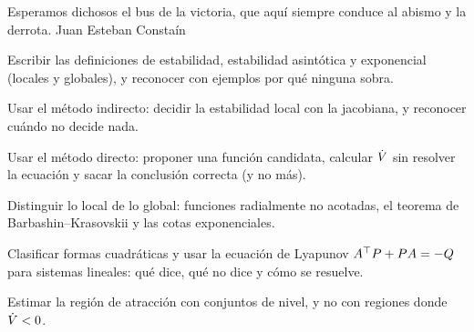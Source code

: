 
  {Esperamos dichosos el bus de la victoria, que aquí siempre conduce al abismo y la derrota.}
  {Juan Esteban Constaín}

\begin{objetivos}
  \item Escribir las definiciones de estabilidad, estabilidad asintótica y exponencial (locales y globales), y reconocer con ejemplos por qué ninguna sobra.
  \item Usar el método indirecto: decidir la estabilidad local con la jacobiana, y reconocer cuándo no decide nada.
  \item Usar el método directo: proponer una función candidata, calcular $\dot V$ sin resolver la ecuación y sacar la conclusión correcta (y no más).
  \item Distinguir lo local de lo global: funciones radialmente no acotadas, el teorema de Barbashin--Krasovskii y las cotas exponenciales.
  \item Clasificar formas cuadráticas y usar la ecuación de Lyapunov $A^{\top} P+PA=-Q$ para sistemas lineales: qué dice, qué no dice y cómo se resuelve.
  \item Estimar la región de atracción con conjuntos de nivel, y no con regiones donde $\dot V<0$.
\end{objetivos}











